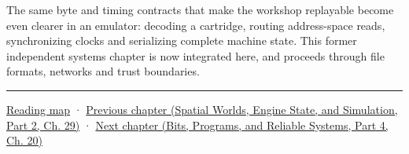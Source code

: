 \hypertarget{06-engine-ii-ch041-reproducing-an-entire-machine-is-an-engine-systems-test}{}

The same byte and timing contracts that make the workshop replayable become even clearer in an emulator: decoding a cartridge, routing address-space reads, synchronizing clocks and serializing complete machine state. This former independent systems chapter is now integrated here, and proceeds through file formats, networks and trust boundaries.

\begin{center}\rule{0.5\linewidth}{0.5pt}\end{center}

\hyperref[volume-reading-map]{Reading map} · \href{../05-Spatial-Worlds-Engine-State-and-Simulation-P02/main.pdf\#nameddest=06-engine-ii-ch040-coupled-contacts-and-iterative-response}{Previous chapter (Spatial Worlds, Engine State, and Simulation, Part 2, Ch. 29)} · \href{../01-Bits-Programs-and-Reliable-Systems-P04/main.pdf\#nameddest=06-engine-ii-ch042-from-cartridge-bytes-to-a-reproducible-machine}{Next chapter (Bits, Programs, and Reliable Systems, Part 4, Ch. 20)}
